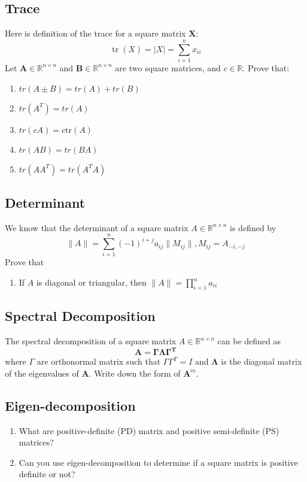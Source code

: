 \documentclass[11pt,a4paper]{article}
\begin{document}
\begin{CJK*}{UTF8}{gbsn}
\subsection{Trace}
Here is definition of the trace for a square matrix $\mathbf{X}$:
$$
\operatorname{tr}(X) = |X| = \sum_{i=1}^n x_{ii}
$$
Let $\textbf{A} \in \mathbb{R}^{n \times n}$ and $\textbf{B} \in 
\mathbb{R}^{n \times n}$ are two square matrices, and $c \in \mathbb{R}$.
Prove that:
\begin{enumerate}[(1)]
    \item $tr(A \pm B) = tr(A) + tr(B)$
    \item $tr(A^T) = tr(A)$
    \item $tr(cA) = c \mathrm{tr}(A)$
    \item $tr(AB) = tr(BA)$
    \item $tr(AA^T) = tr(A^T A)$
\end{enumerate}

\subsection{Determinant}
We know that the determinant of a square matrix $A \in \mathbb{R}^{n \times n}$ 
is defined by
$$
\| A \| = \sum_{i=1}^n (-1)^{i+j} a_{ij} \| M_{ij} \|, M_{ij} = A_{-i, -j}
$$
Prove that
\begin{enumerate}[(1)]
    \item If $A$ is diagonal or triangular, then $\| A \| = \prod_{i=1}^n a_{ii}$
\end{enumerate}

\subsection{Spectral Decomposition}
The spectral decomposition of a square matrix $A \in \mathbb{R}^{n \times n}$ can 
be defined as
$$
\mathbf{A = \Gamma \Lambda \Gamma^T}
$$
where $\Gamma$ are orthonormal matrix such that $\Gamma \Gamma^T = I$ and 
$\mathbf{\Lambda}$ is the diagonal matrix of the eigenvalues of $\mathbf{A}$.
Write down the form of $\mathbf{A}^{m}$.

\subsection{Eigen-decomposition}
\begin{enumerate}[(1)]
    \item What are positive-definite (PD) matrix and positive 
        semi-definite (PS) matrices?
    \item Can you use eigen-decomposition to determine if a 
        square matrix is positive definite or not? 
\end{enumerate}


\end{CJK*}
\end{document}
